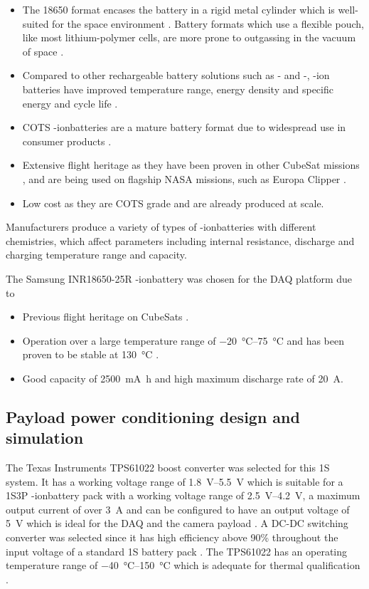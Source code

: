 \documentclass[draft]{report}
\newcommand{\liion}{\ce{Li}-ion}
\begin{document}
\begin{itemize}
  \item The 18650 format encases the battery in a rigid metal cylinder which is well-suited for the space environment \cite{knap2020review}. Battery formats which use a flexible pouch, like most lithium-polymer cells, are more prone to outgassing in the vacuum of space \cite{knap2020review}.
  \item Compared to other rechargeable battery solutions such as - and -, -ion batteries have improved temperature range, energy density and specific energy and cycle life \cite{pathak2023review}.
  \item COTS \liion batteries are a mature battery format due to widespread use in consumer products \cite{pathak2023review}.
  \item Extensive flight heritage as they have been proven in other CubeSat missions \cite{knap2020review}, and are being used on flagship NASA missions, such as Europa Clipper \cite{krause2021performance}.
  \item Low cost as they are COTS grade and are already produced at scale. %
\end{itemize}

Manufacturers produce a variety of types of \liion batteries with different chemistries, which affect parameters including internal resistance, discharge and charging temperature range and capacity.

The Samsung INR18650-25R \liion battery was chosen for the DAQ platform due to
\begin{itemize}
  \item Previous flight heritage on CubeSats \cite{marcelino2021orbit}.
  \item Operation over a large temperature range of \SIrange{-20}{75}{\degreeCelsius} and has been proven to be stable at \SI{130}{\degreeCelsius} \cite{samsung2014}.
  \item Good capacity of \SI{2500}{\milli\ampere\hour} and high maximum discharge rate of \SI{20}{\ampere}.
\end{itemize}

\subsection{Payload power conditioning design and simulation}

The Texas Instruments TPS61022 boost converter was selected for this 1S system. It has a working voltage range of \SIrange{1.8}{5.5}{\volt} which is suitable for a 1S3P \liion battery pack with a working voltage range of \SIrange{2.5}{4.2}{\volt}, a maximum output current of over \SI{3}{\ampere} and can be configured to have an output voltage of \SI{5}{\volt} which is ideal for the DAQ and the camera payload \cite{ti2021tps61022}. A DC-DC switching converter was selected since it has high efficiency above 90\% throughout the input voltage of a standard 1S battery pack \cite{ti2021tps61022}. The TPS61022 has an operating temperature range of \SIrange{-40}{150}{\degreeCelsius} which is adequate for thermal qualification \cite{ti2021tps61022}. %
\end{document}
